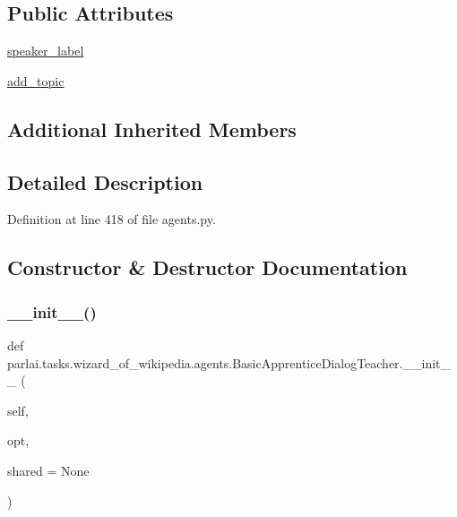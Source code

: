 \subsection*{Public Attributes}
\begin{DoxyCompactItemize}
\item 
\hyperlink{classparlai_1_1tasks_1_1wizard__of__wikipedia_1_1agents_1_1BasicApprenticeDialogTeacher_a68999910fbe14ab7c1e60e48b692480d}{speaker\+\_\+label}
\item 
\hyperlink{classparlai_1_1tasks_1_1wizard__of__wikipedia_1_1agents_1_1BasicApprenticeDialogTeacher_a7e627699dba099f69d5ce0b139caa02e}{add\+\_\+topic}
\end{DoxyCompactItemize}
\subsection*{Additional Inherited Members}


\subsection{Detailed Description}


Definition at line 418 of file agents.\+py.



\subsection{Constructor \& Destructor Documentation}
\mbox{\label{classparlai_1_1tasks_1_1wizard__of__wikipedia_1_1agents_1_1BasicApprenticeDialogTeacher_ad8d773c291ac75c5ecd1ec1d3f2a0797}} 
\subsubsection{\texorpdfstring{\+\_\+\+\_\+init\+\_\+\+\_\+()}{\_\_init\_\_()}}
{\footnotesize\ttfamily def parlai.\+tasks.\+wizard\+\_\+of\+\_\+wikipedia.\+agents.\+Basic\+Apprentice\+Dialog\+Teacher.\+\_\+\+\_\+init\+\_\+\+\_\+ (\begin{DoxyParamCaption}\item[{}]{self,  }\item[{}]{opt,  }\item[{}]{shared = {\ttfamily None} }\end{DoxyParamCaption})}



